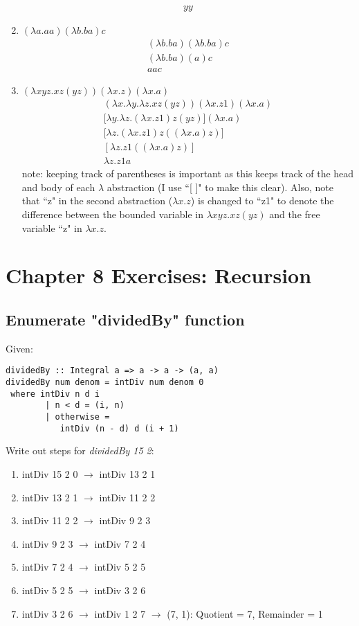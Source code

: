 \documentclass[a4paper, 11pt]{article}
\begin{document}
\begin{enumerate}
\begin{align*}
yy
\end{align*}
%
\item $(\lambda a.aa)(\lambda b.ba)c$
%
\begin{align*}
(\lambda b.ba)(\lambda b.ba)c \\
(\lambda b.ba)(a)c \\
aac
\end{align*}
%
\item $(\lambda xyz.xz(yz))(\lambda x.z)(\lambda x.a)$
%
\begin{align*}
(\lambda x.\lambda y.\lambda z.xz(yz))(\lambda x.z1)(\lambda x.a) \\
\big[\lambda y.\lambda z.(\lambda x.z1)z(yz) \big](\lambda x.a) \\
\big[\lambda z.(\lambda x.z1)z((\lambda x.a)z) \big]\\
[\lambda z.z1((\lambda x.a)z)] \\
\lambda z.z1a
\end{align*}
%
note: keeping track of parentheses is important as this keeps track of the head and body of each $\lambda$ abstraction (I use ``[ ]" to make this clear). Also, note that ``z" in the second abstraction ($\lambda x.z$) is changed to ``z1" to denote the difference between the bounded variable in $\lambda xyz.xz(yz)$ and the free variable ``z" in $\lambda x.z$.
\end{enumerate}

\section{Chapter 8 Exercises: Recursion}
\subsection{Enumerate "dividedBy" function}
Given:
\lstset{language=Haskell}
\begin{lstlisting}[frame=single]
dividedBy :: Integral a => a -> a -> (a, a)
dividedBy num denom = intDiv num denom 0
 where intDiv n d i
        | n < d = (i, n)
        | otherwise =
           intDiv (n - d) d (i + 1)
\end{lstlisting}
%
Write out steps for \textit{dividedBy 15 2}:

\begin{enumerate}
\item intDiv 15 2 0 $\rightarrow$ intDiv 13 2 1
\item intDiv 13 2 1 $\rightarrow$ intDiv 11 2 2
\item intDiv 11 2 2 $\rightarrow$ intDiv 9 2 3
\item intDiv 9 2 3 $\rightarrow$ intDiv 7 2 4
\item intDiv 7 2 4 $\rightarrow$ intDiv 5 2 5
\item intDiv 5 2 5 $\rightarrow$ intDiv 3 2 6
\item intDiv 3 2 6 $\rightarrow$ intDiv 1 2 7 $\rightarrow$ (7, 1): Quotient = 7, Remainder = 1
\end{enumerate}
\end{document}
